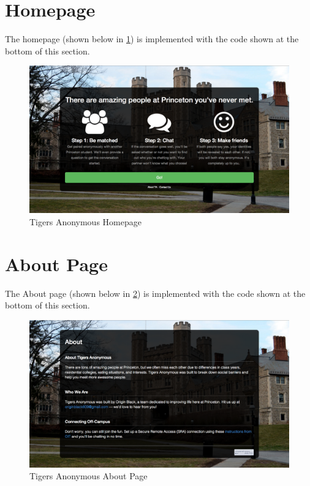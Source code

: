 \section{Homepage}

The homepage (shown below in \ref{fig:TAHomepage}) is implemented with the code shown at the bottom of this section.

\begin{figure}[h]
\centering
\includegraphics[trim= 35mm 0mm 35mm 0mm, clip, scale=0.25]{./Figures/TAHomepage}
\caption{Tigers Anonymous Homepage}
\label{fig:TAHomepage}
\end{figure}

\lstset{language=HTML}


\section{About Page}

The About page (shown below in \ref{fig:TAAbout}) is implemented with the code shown at the bottom of this section.

\begin{figure}[h]
\centering
\includegraphics[trim= 35mm 0mm 35mm 0mm, clip, scale=0.25]{./Figures/TAAbout}
\caption{Tigers Anonymous About Page}
\label{fig:TAAbout}
\end{figure}


